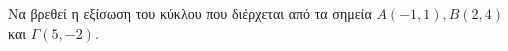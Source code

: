 Να βρεθεί η εξίσωση του κύκλου που διέρχεται από τα σημεία $ A(-1,1),B(2,4) $ και $ \varGamma(5,-2) $.
